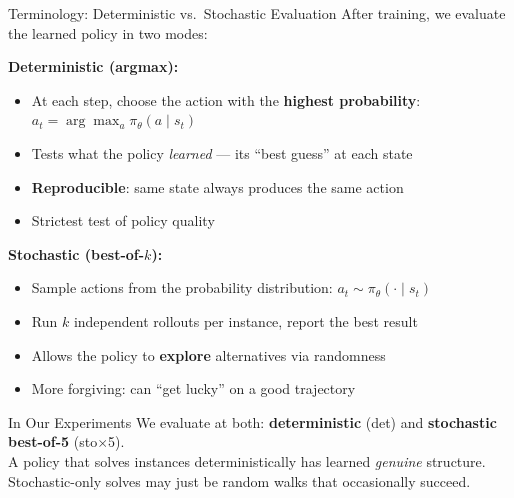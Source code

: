 \documentclass[aspectratio=169,11pt]{beamer}
\begin{document}
\begin{frame}{Terminology: Deterministic vs.\ Stochastic Evaluation}
  \small
  After training, we evaluate the learned policy in two modes:

  \medskip
  \textbf{Deterministic (argmax):}
  \begin{itemize}\setlength\itemsep{2pt}
    \item At each step, choose the action with the \textbf{highest probability}:
      $a_t = \arg\max_a \pi_\theta(a \mid s_t)$
    \item Tests what the policy \emph{learned} --- its ``best guess'' at each state
    \item \textbf{Reproducible}: same state always produces the same action
    \item Strictest test of policy quality
  \end{itemize}

  \medskip
  \textbf{Stochastic (best-of-$k$):}
  \begin{itemize}\setlength\itemsep{2pt}
    \item Sample actions from the probability distribution:
      $a_t \sim \pi_\theta(\cdot \mid s_t)$
    \item Run $k$ independent rollouts per instance, report the best result
    \item Allows the policy to \textbf{explore} alternatives via randomness
    \item More forgiving: can ``get lucky'' on a good trajectory
  \end{itemize}

  \medskip
  \begin{block}{In Our Experiments}
    We evaluate at both: \textbf{deterministic} (det) and \textbf{stochastic best-of-5} (sto$\times$5).\\
    A policy that solves instances deterministically has learned \emph{genuine} structure.\\
    Stochastic-only solves may just be random walks that occasionally succeed.
  \end{block}
\end{frame}
\end{document}
